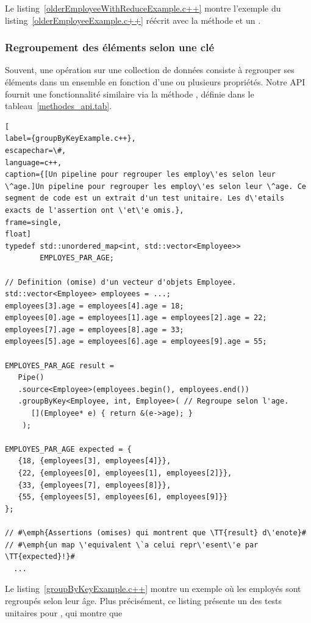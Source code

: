 Le listing~\ref{olderEmployeeWithReduceExample.c++} montre l'exemple du listing~\ref{olderEmployeeExample.c++} r\'e\'ecrit avec la m\'ethode  et un .


\subsubsection{Regroupement des \'el\'ements selon une cl\'e}

Souvent, une op\'eration sur une collection de donn\'ees consiste \`a regrouper ses \'el\'ements dans un ensemble en fonction d'une ou plusieurs propri\'et\'es. Notre {API} fournit une fonctionnalit\'e similaire via la m\'ethode , d\'efinie dans le tableau~\ref{methodes_api.tab}. 


\begin{lstlisting}[
label={groupByKeyExample.c++},
escapechar=\#,
language=c++,
caption={[Un pipeline pour regrouper les employ\'es selon leur \^age.]Un pipeline pour regrouper les employ\'es selon leur \^age. Ce segment de code est un extrait d'un test unitaire. Les d\'etails exacts de l'assertion ont \'et\'e omis.},
frame=single,
float]
typedef std::unordered_map<int, std::vector<Employee>> 
        EMPLOYES_PAR_AGE;

// Definition (omise) d'un vecteur d'objets Employee.
std::vector<Employee> employees = ...; 
employees[3].age = employees[4].age = 18;
employees[0].age = employees[1].age = employees[2].age = 22;
employees[7].age = employees[8].age = 33;
employees[5].age = employees[6].age = employees[9].age = 55;

EMPLOYES_PAR_AGE result = 
   Pipe()
   .source<Employee>(employees.begin(), employees.end())
   .groupByKey<Employee, int, Employee>( // Regroupe selon l'age.
      [](Employee* e) { return &(e->age); } 
    );
    
EMPLOYES_PAR_AGE expected = {
   {18, {employees[3], employees[4]}},
   {22, {employees[0], employees[1], employees[2]}},
   {33, {employees[7], employees[8]}},
   {55, {employees[5], employees[6], employees[9]}}
};

// #\emph{Assertions (omises) qui montrent que \TT{result} d\'enote}#
// #\emph{un map \'equivalent \`a celui repr\'esent\'e par \TT{expected}!}#
  ...
\end{lstlisting}




Le listing~\ref{groupByKeyExample.c++} montre un exemple o\`u les employ\'es sont regroup\'es selon leur \^age. Plus pr\'ecis\'ement, ce listing pr\'esente un des tests unitaires pour , qui montre que%
%




